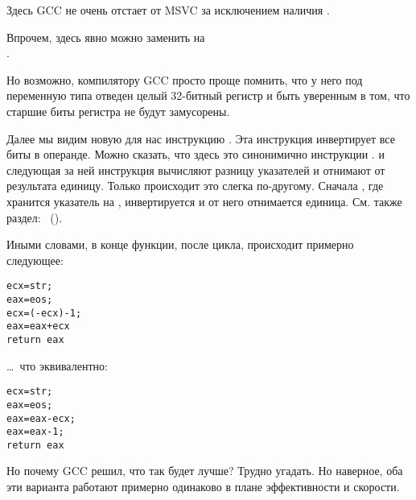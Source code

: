 Здесь GCC не очень отстает от MSVC за исключением наличия \MOVZX. 

Впрочем, \MOVZX здесь явно можно заменить на\\
.

Но возможно, компилятору GCC просто проще помнить, что у него под переменную типа \Tchar отведен целый 
32-битный регистр \EDX и быть уверенным в том, что старшие биты регистра не будут замусорены.

\label{strlen_NOT_ADD}
Далее мы видим новую для нас инструкцию \NOT. Эта инструкция инвертирует все биты в операнде. 
Можно сказать, что здесь это синонимично инструкции . 
\NOT и следующая за ней инструкция \ADD вычисляют разницу указателей и отнимают от результата единицу. 
Только происходит это слегка по-другому. Сначала \ECX, где хранится указатель на , 
инвертируется и от него отнимается единица.
См. также раздел: \q{\SignedNumbersSectionName}~().

Иными словами, в конце функции, после цикла, происходит примерно следующее: 

\begin{lstlisting}
ecx=str;
eax=eos;
ecx=(-ecx)-1; 
eax=eax+ecx
return eax
\end{lstlisting}

\dots~что эквивалентно:

\begin{lstlisting}
ecx=str;
eax=eos;
eax=eax-ecx;
eax=eax-1;
return eax
\end{lstlisting}

Но почему GCC решил, что так будет лучше? Трудно угадать.
Но наверное, оба эти варианта работают примерно одинаково в плане эффективности и скорости.
